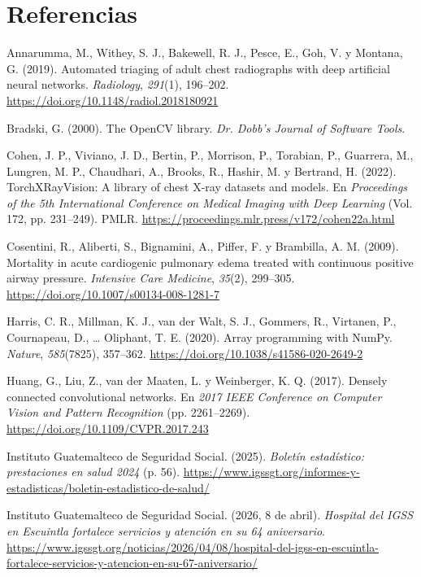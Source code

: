 \documentclass[11pt,letterpaper]{article}
\begin{document}
\section*{Referencias}
{\setlength{\parindent}{-1.25em}\setlength{\leftskip}{1.25em}\setlength{\parskip}{3pt}

Annarumma, M., Withey, S. J., Bakewell, R. J., Pesce, E., Goh, V. y Montana, G. (2019). Automated triaging of adult chest radiographs with deep artificial neural networks. \textit{Radiology}, \textit{291}(1), 196--202. \url{https://doi.org/10.1148/radiol.2018180921}

Bradski, G. (2000). The OpenCV library. \textit{Dr. Dobb's Journal of Software Tools}.

Cohen, J. P., Viviano, J. D., Bertin, P., Morrison, P., Torabian, P., Guarrera, M., Lungren, M. P., Chaudhari, A., Brooks, R., Hashir, M. y Bertrand, H. (2022). TorchXRayVision: A library of chest X-ray datasets and models. En \textit{Proceedings of the 5th International Conference on Medical Imaging with Deep Learning} (Vol. 172, pp. 231--249). PMLR. \url{https://proceedings.mlr.press/v172/cohen22a.html}

Cosentini, R., Aliberti, S., Bignamini, A., Piffer, F. y Brambilla, A. M. (2009). Mortality in acute cardiogenic pulmonary edema treated with continuous positive airway pressure. \textit{Intensive Care Medicine}, \textit{35}(2), 299--305. \url{https://doi.org/10.1007/s00134-008-1281-7}

Harris, C. R., Millman, K. J., van der Walt, S. J., Gommers, R., Virtanen, P., Cournapeau, D., \ldots{} Oliphant, T. E. (2020). Array programming with NumPy. \textit{Nature}, \textit{585}(7825), 357--362. \url{https://doi.org/10.1038/s41586-020-2649-2}

Huang, G., Liu, Z., van der Maaten, L. y Weinberger, K. Q. (2017). Densely connected convolutional networks. En \textit{2017 IEEE Conference on Computer Vision and Pattern Recognition} (pp. 2261--2269). \url{https://doi.org/10.1109/CVPR.2017.243}

Instituto Guatemalteco de Seguridad Social. (2025). \textit{Boletín estadístico: prestaciones en salud 2024} (p. 56). \url{https://www.igssgt.org/informes-y-estadisticas/boletin-estadistico-de-salud/}

Instituto Guatemalteco de Seguridad Social. (2026, 8 de abril). \textit{Hospital del IGSS en Escuintla fortalece servicios y atención en su 64 aniversario}. \url{https://www.igssgt.org/noticias/2026/04/08/hospital-del-igss-en-escuintla-fortalece-servicios-y-atencion-en-su-67-aniversario/}

}
\end{document}
